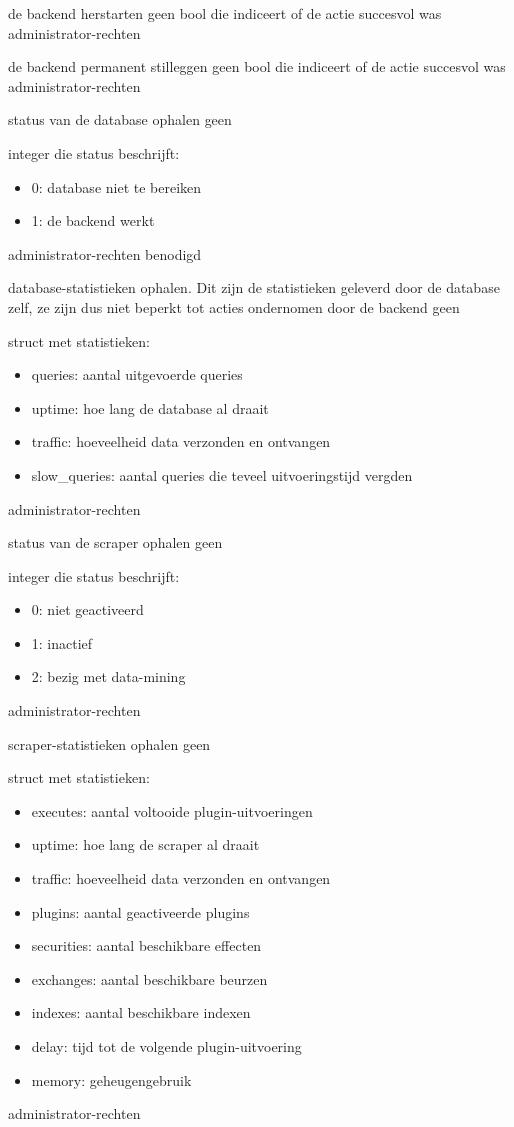 	{ de backend herstarten }
	{ geen }
	{ bool die indiceert of de actie succesvol was }
	{ administrator-rechten }

	{ de backend permanent stilleggen }
	{ geen }
	{ bool die indiceert of de actie succesvol was }
	{ administrator-rechten }

	{ status van de database ophalen }
	{ geen }
	{ integer die status beschrijft:
		\begin{itemize}
		\item{0: database niet te bereiken}
		\item{1: de backend werkt}
		\end{itemize} }
	{ administrator-rechten benodigd}

	{ database-statistieken ophalen. Dit zijn de statistieken geleverd door de database zelf, ze zijn dus niet beperkt tot acties ondernomen door de backend }
	{ geen }
	{ struct met statistieken:
		\begin{itemize}
		\item{queries: aantal uitgevoerde queries}
		\item{uptime: hoe lang de database al draait}
		\item{traffic: hoeveelheid data verzonden en ontvangen}
		\item{slow\_queries: aantal queries die teveel uitvoeringstijd vergden}
		\end{itemize} }
	{ administrator-rechten }

	{ status van de scraper ophalen }
	{ geen }
	{ integer die status beschrijft:
		\begin{itemize}
		\item{0: niet geactiveerd}
		\item{1: inactief}
		\item{2: bezig met data-mining}
		\end{itemize} }
	{ administrator-rechten }

	{ scraper-statistieken ophalen }
	{ geen }
	{ struct met statistieken:
		\begin{itemize}
		\item{executes: aantal voltooide plugin-uitvoeringen}
		\item{uptime: hoe lang de scraper al draait}
		\item{traffic: hoeveelheid data verzonden en ontvangen}
		\item{plugins: aantal geactiveerde plugins}
		\item{securities: aantal beschikbare effecten}
		\item{exchanges: aantal beschikbare beurzen}
		\item{indexes: aantal beschikbare indexen}
		\item{delay: tijd tot de volgende plugin-uitvoering}
		\item{memory: geheugengebruik}
		\end{itemize} }
	{ administrator-rechten }

